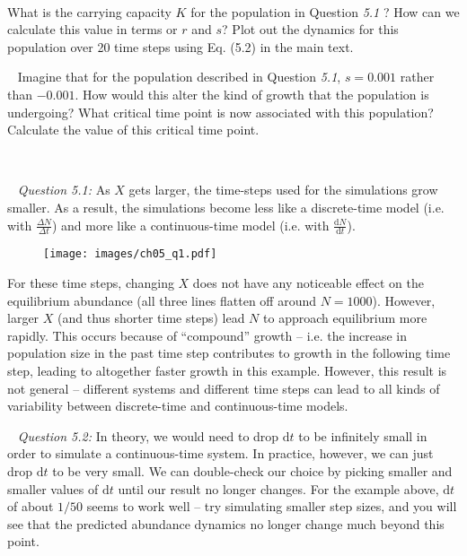 \documentclass[12pt]{article}
\begin{document}
~\newline
{}
\newline

What is the carrying capacity $K$ for the population in Question \textit{5.1} ? How can we calculate this value in terms or $r$ and $s$? Plot out the dynamics for this population over 20 time steps using Eq. (5.2) in the main text. 


~\newline
{}
\newline
Imagine that for the population described in Question \textit{5.1}, $s = 0.001$ rather than $-0.001$. How would this alter the kind of growth that the population is undergoing? What critical time point is now associated with this population? Calculate the value of this critical time point.

~\newline

\pagebreak
{}

~\newline
\textit{Question 5.1:}
\newline
As $X$ gets larger, the time-steps used for the simulations grow smaller. As a result, the simulations become less like a discrete-time model (i.e. with $\frac{\Delta N}{\Delta t}$) and more like a continuous-time model (i.e. with $\frac{\mathrm{d}N}{\mathrm{d}t}$).

\begin{figure}[ht]
  \texttt{[image: images/ch05\_q1.pdf]}
\end{figure}


For these time steps, changing $X$ does not have any noticeable effect on the equilibrium abundance (all three lines flatten off around $N = 1000$). However, larger $X$ (and thus shorter time steps) lead $N$ to approach equilibrium more rapidly. This occurs because of ``compound'' growth -- i.e. the increase in population size in the past time step contributes to growth in the following time step, leading to altogether faster growth in this example. However, this result is not general -- different systems and different time steps can lead to all kinds of variability between discrete-time and continuous-time models.

~\newline
\textit{Question 5.2:}
\newline
In theory, we would need to drop $\mathrm{d}t$ to be infinitely small in order to simulate a continuous-time system. In practice, however, we can just drop $\mathrm{d}t$ to be very small. We can double-check our choice by picking smaller and smaller values of $\mathrm{d}t$ until our result no longer changes. For the example above, $\mathrm{d}t$ of about $1/50$ seems to work well -- try simulating smaller step sizes, and you will see that the predicted abundance dynamics no longer change much beyond this point.
\end{document}
